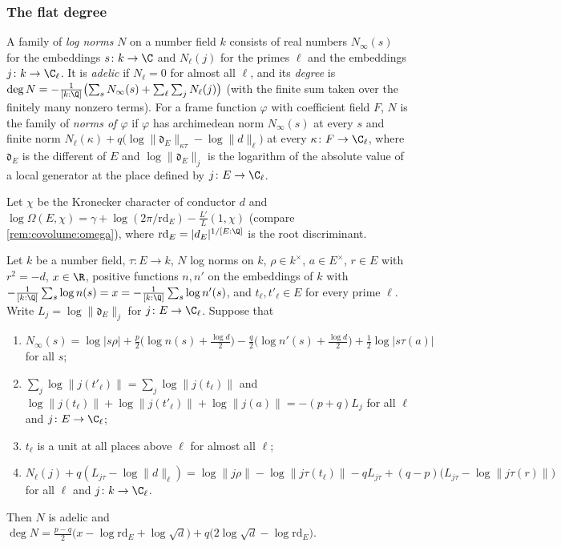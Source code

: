 \subsubsection*{The flat degree}
\begin{definition}\label{pf:covol:def:lognorms}
A family of \emph{log norms} $N$ on a number field $k$ consists of real numbers $N_\infty(s)$ for the
embeddings $s\colon k\to\C$ and $N_\ell(j)$ for the primes $\ell$ and the embeddings $j\colon k\to\C_\ell$. It
is \emph{adelic} if $N_\ell=0$ for almost all $\ell$, and its \emph{degree} is
$\deg N=-\frac1{[k:\Q]}\bigl(\sum_sN_\infty(s)+\sum_\ell\sum_jN_\ell(j)\bigr)$ (with the finite sum taken over the
finitely many nonzero terms). For a frame function $\varphi$ with coefficient field $F$, $N$ is the family of
\emph{norms of $\varphi$} if $\varphi$ has archimedean norm $N_\infty(s)$ at every $s$ and finite norm
$N_\ell(\kappa)+q\bigl(\log\|\mathfrak d_E\|_{\kappa\tau}-\log\|d\|_\ell\bigr)$ at every $\kappa\colon
F\to\C_\ell$, where $\mathfrak d_E$ is the different of $E$ and $\log\|\mathfrak d_E\|_{j}$ is the logarithm
of the absolute value of a local generator at the place defined by $j\colon E\to\C_\ell$.
\end{definition}

Let $\chi$ be the Kronecker character of conductor $d$ and
$\log\Omega(E,\chi)=\gamma+\log(2\pi/\mathrm{rd}_E)-\frac{L'}{L}(1,\chi)$ (compare \cref{rem:covolume:omega}),
where $\mathrm{rd}_E=|d_E|^{1/[E:\Q]}$ is the root discriminant.

\begin{lemma}\label{pf:covol:lem:adelic}
Let $k$ be a number field, $\tau\colon E\to k$, $N$ log norms on $k$, $\rho\in k^\times$, $a\in E^\times$,
$r\in E$ with $r^2=-d$, $x\in\R$, positive functions $n,n'$ on the embeddings of $k$ with
$-\frac1{[k:\Q]}\sum_s\log n(s)=x=-\frac1{[k:\Q]}\sum_s\log n'(s)$, and $t_\ell,t'_\ell\in E$ for every prime
$\ell$. Write $L_j=\log\|\mathfrak d_E\|_j$ for $j\colon E\to\C_\ell$. Suppose that
\begin{enumerate}[label=(\roman*)]
\item $N_\infty(s)=\log|s\rho|+\frac p2\bigl(\log n(s)+\frac{\log d}2\bigr)-\frac q2\bigl(\log n'(s)+
  \frac{\log d}2\bigr)+\frac12\log|s\tau(a)|$ for all $s$;
\item $\sum_j\log\|j(t'_\ell)\|=\sum_j\log\|j(t_\ell)\|$ and
  $\log\|j(t_\ell)\|+\log\|j(t'_\ell)\|+\log\|j(a)\|=-(p+q)L_j$ for all $\ell$ and $j\colon E\to\C_\ell$;
\item $t_\ell$ is a unit at all places above $\ell$ for almost all $\ell$;
\item $N_\ell(j)+q(L_{j\tau}-\log\|d\|_\ell)=\log\|j\rho\|-\log\|j\tau(t_\ell)\|-qL_{j\tau}+(q-p)
  \bigl(L_{j\tau}-\log\|j\tau(r)\|\bigr)$ for all $\ell$ and $j\colon k\to\C_\ell$.
\end{enumerate}
Then $N$ is adelic and
$\deg N=\frac{p-q}2\bigl(x-\log\mathrm{rd}_E+\log\sqrt d\bigr)+q\bigl(2\log\sqrt d-\log\mathrm{rd}_E\bigr)$.
\end{lemma}

